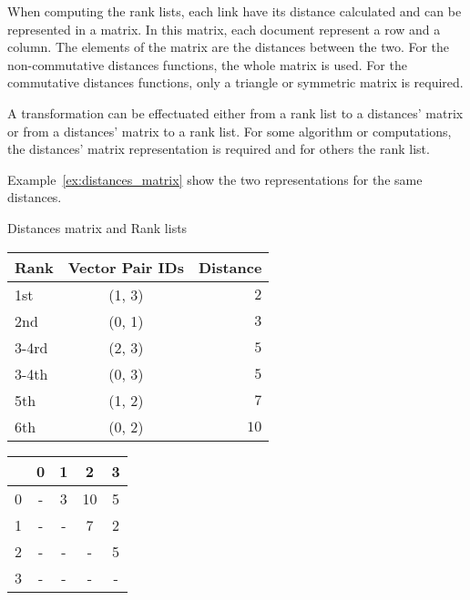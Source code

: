 When computing the rank lists, each link have its distance calculated and can be represented in a matrix.
In this matrix, each document represent a row and a column.
The elements of the matrix are the distances between the two.
For the non-commutative distances functions, the whole matrix is used.
For the commutative distances functions, only a triangle or symmetric matrix is required.

A transformation can be effectuated either from a rank list to a distances' matrix or from a distances' matrix to a rank list.
For some algorithm or computations, the distances' matrix representation is required and for others the rank list.

Example~\ref{ex:distances_matrix} show the two representations for the same distances.

\begin{example}
  \centering
  \caption{Distances matrix and Rank lists}
  \label{ex:distances_matrix}
  \begin{subexample}{\linewidth}
    \centering
    \begin{tabular}{l c r}
      \toprule
      Rank & Vector Pair IDs & Distance \\
      \midrule
      1st   & (1, 3) & $2$ \\
      2nd   & (0, 1) & $3$ \\
      3-4rd & (2, 3) & $5$ \\
      3-4th & (0, 3) & $5$ \\
      5th   & (1, 2) & $7$ \\
      6th   & (0, 2) & $10$ \\
      \bottomrule
    \end{tabular}
  \end{subexample}

  \vspace{0.5cm}

  \begin{subexample}{\linewidth}
    \centering
    \begin{tabular}{c|c c c c}
      \toprule
        & 0 & 1 & 2  & 3 \\
      \midrule
      0 & - & 3 & 10 & 5 \\
      1 & - & - & 7  & 2 \\
      2 & - & - & -  & 5 \\
      3 & - & - & -  & - \\
      \bottomrule
    \end{tabular}
  \end{subexample}
\end{example}

